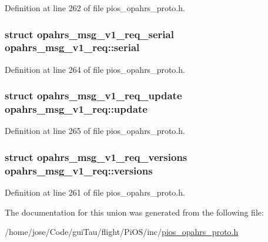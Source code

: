 Definition at line 262 of file pios\-\_\-opahrs\-\_\-proto.\-h.

\hypertarget{unionopahrs__msg__v1__req_a5651db17b6550a51470cba2d37477115}{
\subsubsection[{serial}]{\setlength{\rightskip}{0pt plus 5cm}struct {\bf opahrs\-\_\-msg\-\_\-v1\-\_\-req\-\_\-serial} opahrs\-\_\-msg\-\_\-v1\-\_\-req\-::serial}}\label{unionopahrs__msg__v1__req_a5651db17b6550a51470cba2d37477115}


Definition at line 264 of file pios\-\_\-opahrs\-\_\-proto.\-h.

\hypertarget{unionopahrs__msg__v1__req_a10863c5968cf591f030dc0ee55952665}{
\subsubsection[{update}]{\setlength{\rightskip}{0pt plus 5cm}struct {\bf opahrs\-\_\-msg\-\_\-v1\-\_\-req\-\_\-update} opahrs\-\_\-msg\-\_\-v1\-\_\-req\-::update}}\label{unionopahrs__msg__v1__req_a10863c5968cf591f030dc0ee55952665}


Definition at line 265 of file pios\-\_\-opahrs\-\_\-proto.\-h.

\hypertarget{unionopahrs__msg__v1__req_a3a6779111d0e20269091f28955706cc9}{
\subsubsection[{versions}]{\setlength{\rightskip}{0pt plus 5cm}struct {\bf opahrs\-\_\-msg\-\_\-v1\-\_\-req\-\_\-versions} opahrs\-\_\-msg\-\_\-v1\-\_\-req\-::versions}}\label{unionopahrs__msg__v1__req_a3a6779111d0e20269091f28955706cc9}


Definition at line 261 of file pios\-\_\-opahrs\-\_\-proto.\-h.



The documentation for this union was generated from the following file\-:\begin{DoxyCompactItemize}
\item 
/home/jose/\-Code/gui\-Tau/flight/\-Pi\-O\-S/inc/\hyperlink{pios__opahrs__proto_8h}{pios\-\_\-opahrs\-\_\-proto.\-h}\end{DoxyCompactItemize}
